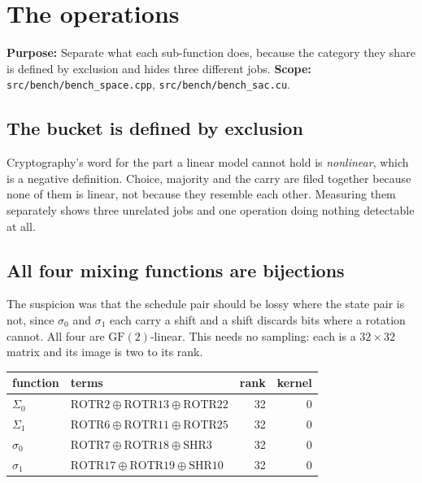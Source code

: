 \chapter{The operations}

\textbf{Purpose:} Separate what each sub-function does, because the category they share is defined by exclusion and hides three different jobs. \textbf{Scope:} \texttt{src/\allowbreak{}bench/\allowbreak{}bench\_\allowbreak{}space.\allowbreak{}cpp}, \texttt{src/\allowbreak{}bench/\allowbreak{}bench\_\allowbreak{}sac.\allowbreak{}cu}.

\section{The bucket is defined by exclusion}

Cryptography's word for the part a linear model cannot hold is \emph{nonlinear}, which is a negative definition. Choice, majority and the carry are filed together because none of them is linear, not because they resemble each other. Measuring them separately shows three unrelated jobs and one operation doing nothing detectable at all.

\section{All four mixing functions are bijections}

The suspicion was that the schedule pair should be lossy where the state pair is not, since \(\sigma_0\) and \(\sigma_1\) each carry a shift and a shift discards bits where a rotation cannot. All four are \(\mathrm{GF}(2)\)-linear. This needs no sampling: each is a \(32 \times 32\) matrix and its image is two to its rank.

\begin{center}
\begin{tabular}{llrr}
\toprule
function & terms & rank & kernel \\
\midrule
\(\Sigma_0\) & \(\mathrm{ROTR}2 \oplus \mathrm{ROTR}13 \oplus \mathrm{ROTR}22\) & 32 & 0 \\
\(\Sigma_1\) & \(\mathrm{ROTR}6 \oplus \mathrm{ROTR}11 \oplus \mathrm{ROTR}25\) & 32 & 0 \\
\(\sigma_0\) & \(\mathrm{ROTR}7 \oplus \mathrm{ROTR}18 \oplus \mathrm{SHR}3\) & 32 & 0 \\
\(\sigma_1\) & \(\mathrm{ROTR}17 \oplus \mathrm{ROTR}19 \oplus \mathrm{SHR}10\) & 32 & 0 \\
\bottomrule
\end{tabular}
\end{center}

